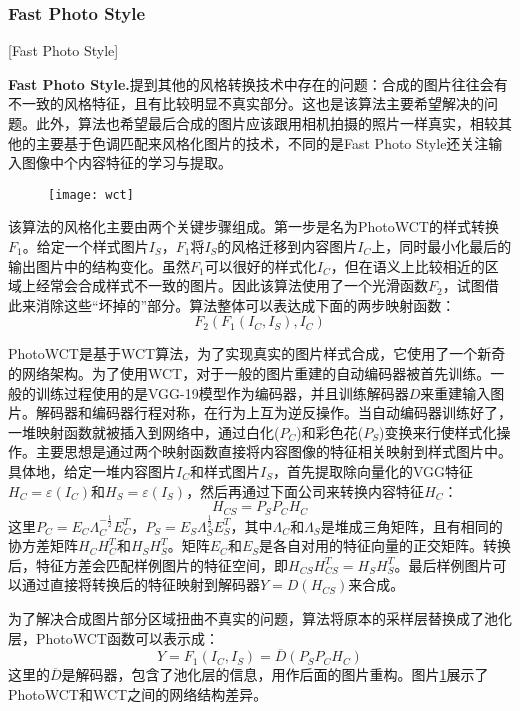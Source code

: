 
\subsubsection{Fast Photo Style}[Fast Photo Style]

\textbf{Fast Photo Style.}\cite{fps}\quad  提到其他的风格转换技术中存在的问题：合成的图片往往会有不一致的风格特征，且有比较明显不真实部分。这也是该算法主要希望解决的问题。此外，算法也希望最后合成的图片应该跟用相机拍摄的照片一样真实，相较其他的主要基于色调匹配来风格化图片的技术，不同的是Fast Photo Style还关注输入图像中个内容特征的学习与提取。

\begin{figure}[t]
    \centering
    \texttt{[image: wct]}
    \caption{}
    \label{wctf}
\end{figure}

该算法的风格化主要由两个关键步骤组成。第一步是名为PhotoWCT的样式转换$F_1$。给定一个样式图片$I_S$，$F_1$将$I_S$的风格迁移到内容图片$I_C$上，同时最小化最后的输出图片中的结构变化。虽然$F_1$可以很好的样式化$I_C$，但在语义上比较相近的区域上经常会合成样式不一致的图片。因此该算法使用了一个光滑函数$F_2$，试图借此来消除这些“坏掉的”部分。算法整体可以表达成下面的两步映射函数：
$$F_2(F_1(I_C,I_S),I_C)$$

PhotoWCT是基于WCT\cite{wctp}算法，为了实现真实的图片样式合成，它使用了一个新奇的网络架构。为了使用WCT，对于一般的图片重建的自动编码器被首先训练。一般的训练过程使用的是VGG-19模型作为编码器\varepsilon，并且训练解码器$D$来重建输入图片。解码器和编码器行程对称，在行为上互为逆反操作。当自动编码器训练好了，一堆映射函数就被插入到网络中，通过白化($P_C$)和彩色花($P_S$)变换来行使样式化操作。主要思想是通过两个映射函数直接将内容图像的特征相关映射到样式图片中。具体地，给定一堆内容图片$I_C$和样式图片$I_S$，首先提取除向量化的VGG特征$H_C=\varepsilon(I_C)$和$H_S=\varepsilon(I_S)$，然后再通过下面公司来转换内容特征$H_C$：
$$H_{CS}=P_SP_CH_C$$
这里$P_C=E_C\Lambda_C^{-\frac{1}{2}}E_C^T$，$P_S=E_S\Lambda_S^{\frac{1}{2}}E_S^T$，其中$\Lambda_C$和$\Lambda_S$是堆成三角矩阵，且有相同的协方差矩阵$H_CH_C^T$和$H_SH_S^T$。矩阵$E_C$和$E_S$是各自对用的特征向量的正交矩阵。转换后，特征方差会匹配样例图片的特征空间，即$H_{CS}H_{CS}^T=H_SH_S^T$。最后样例图片可以通过直接将转换后的特征映射到解码器$Y=D(H_{CS})$来合成。

为了解决合成图片部分区域扭曲不真实的问题，算法将原本的采样层替换成了池化层，PhotoWCT函数可以表示成：
$$Y=F_1(I_C,I_S)=\overline{D}(P_SP_CH_C)$$
这里的$\overline{D}$是解码器，包含了池化层的信息，用作后面的图片重构。图片\ref{wctf}展示了PhotoWCT和WCT之间的网络结构差异。

